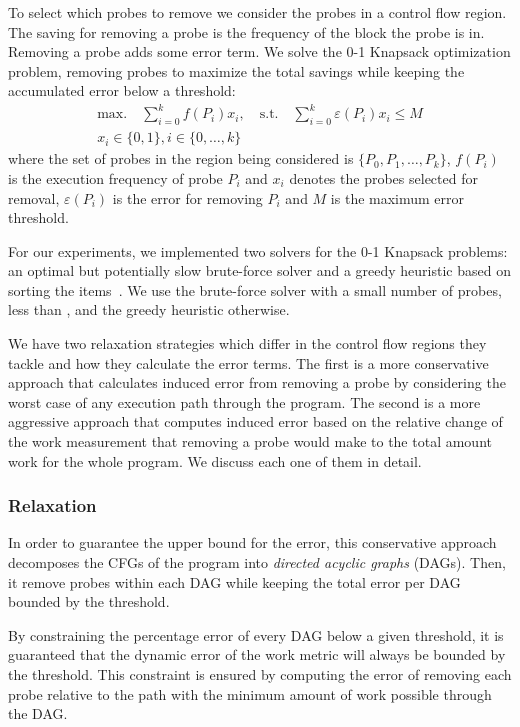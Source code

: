To select which probes to remove we consider the probes in a control flow region. The saving for removing a probe is the frequency of the block the probe is in. Removing a probe adds some error term. We solve the 0-1 Knapsack optimization problem, removing probes to maximize the total savings while keeping the accumulated error below a threshold:
\begin{gather*}
    \textrm{max.}\quad\sum_{i=0}^{k} f(P_i)x_i,\quad
    \textrm{s.t.}\quad\sum_{i=0}^{k} \varepsilon(P_i)x_i \leq M \\
    x_i\in\{0,1\}, i\in\{0,\ldots,k\}
\end{gather*}
where the set of probes in the region being considered is $\{P_0, P_1, \ldots, P_k\}$, $f(P_i)$ is the execution frequency of probe $P_i$ and $x_i$ denotes the probes selected for removal, $\varepsilon(P_i)$ is the error for removing $P_i$ and $M$ is the maximum error threshold.

For our experiments, we implemented two solvers for the 0-1 Knapsack problems: an optimal but potentially slow brute-force solver and a
greedy heuristic based on sorting the items~\citep{dantzig57}. We use the brute-force solver with a small number of probes, less than
, and the greedy heuristic otherwise.

We have two relaxation strategies which differ in the control flow regions they tackle and how they calculate the error terms. The first is
a more conservative approach that calculates induced error from removing a probe by considering the worst case of any execution path
through the program. The second is a more aggressive approach that computes induced error based on the relative change of the work
measurement that removing a probe would make to the total amount work for the whole program. We discuss each one of them in detail.

\subsubsection{\WCRelaxTitle Relaxation}

In order to guarantee the upper bound for the error, this conservative approach
decomposes the CFGs of the program into \textit{directed acyclic graphs} (DAGs).
Then, it remove probes within each DAG while
keeping the total error per DAG bounded by the threshold.

By constraining the percentage error of every DAG below a given threshold,
it is guaranteed that the dynamic error of the work metric
will always be bounded by the threshold.
This constraint is ensured by computing the error of removing each probe relative
to the path with the minimum amount of work possible through the DAG.

